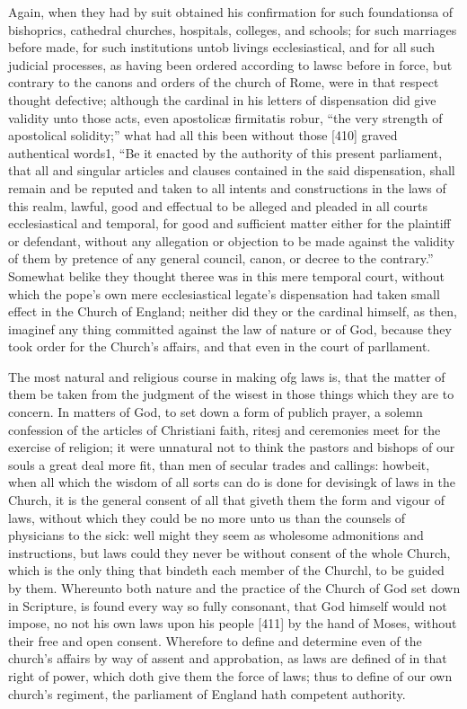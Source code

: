 Again, when they had by suit obtained his confirmation for such foundationsa of bishoprics, cathedral churches, hospitals, colleges, and schools; for such marriages before made, for such institutions untob livings ecclesiastical, and for all such judicial processes, as having been ordered according to lawsc before in force, but contrary to the canons and orders of the church of Rome, were in that respect thought defective; although the cardinal in his letters of dispensation did give validity unto those acts, even apostolicæ firmitatis robur, “the very strength of apostolical solidity;” what had all this been without those [410] graved authentical words1, “Be it enacted by the authority of this present parliament, that all and singular articles and clauses contained in the said dispensation, shall remain and be reputed and taken to all intents and constructions in the laws of this realm, lawful, good and effectual to be alleged and pleaded in all courts ecclesiastical and temporal, for good and sufficient matter either for the plaintiff or defendant, without any allegation or objection to be made against the validity of them by pretence of any general council, canon, or decree to the contrary.” Somewhat belike they thought theree was in this mere temporal court, without which the pope’s own mere ecclesiastical legate’s dispensation had taken small effect in the Church of England; neither did they or the cardinal himself, as then, imaginef any thing committed against the law of nature or of God, because they took order for the Church’s affairs, and that even in the court of parllament.

The most natural and religious course in making ofg laws is, that the matter of them be taken from the judgment of the wisest in those things which they are to concern. In matters of God, to set down a form of publich prayer, a solemn confession of the articles of Christiani faith, ritesj and ceremonies meet for the exercise of religion; it were unnatural not to think the pastors and bishops of our souls a great deal more fit, than men of secular trades and callings: howbeit, when all which the wisdom of all sorts can do is done for devisingk of laws in the Church, it is the general consent of all that giveth them the form and vigour of laws, without which they could be no more unto us than the counsels of physicians to the sick: well might they seem as wholesome admonitions and instructions, but laws could they never be without consent of the whole Church, which is the only thing that bindeth each member of the Churchl, to be guided by them. Whereunto both nature and the practice of the Church of God set down in Scripture, is found every way so fully consonant, that God himself would not impose, no not his own laws upon his people [411] by the hand of Moses, without their free and open consent. Wherefore to define and determine even of the church’s affairs by way of assent and approbation, as laws are defined of in that right of power, which doth give them the force of laws; thus to define of our own church’s regiment, the parliament of England hath competent authority.

